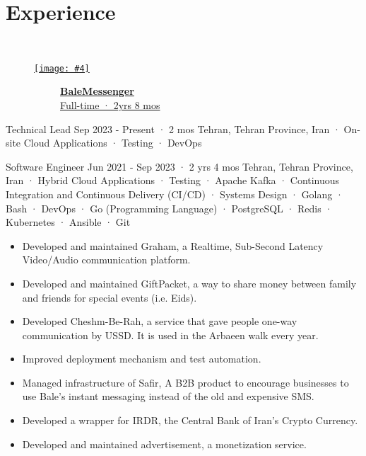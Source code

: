 \documentclass[a4paper,20pt]{article}
\newcommand{\companyHeadingWithImage}[4]{
    \vspace{-24pt}
    \begin{figure}[H]
        \href{#2}{\texttt{[image: \#4]}}
        \vspace{-37.5pt}
    \end{figure}
    ~~~~~~~~~~~\textbf{\href{#2}{#1}} \\
    ~~~~~~~~~~~\href{#2}{#3}
    \vspace{6pt}
}
\newcounter{mylist} %
\newenvironment{myitemize}{%
  \stepcounter{mylist}%
  \begin{itemize}
}{\end{itemize}%
  }
\begin{document}
\section{Experience}\
    \companyHeadingWithImage{BaleMessenger}{https://www.linkedin.com/company/balemessenger}{Full-time · 2yrs 8 mos}{bale}
    \begin{myitemize}
        \begin{newexperience}                
            {Technical Lead}
            {Sep 2023 - Present · 2 mos}
            {Tehran, Tehran Province, Iran · On-site}
            {Cloud Applications · Testing · DevOps}
        \end{newexperience}

        \begin{newexperiencewithdesc}
            {Software Engineer}
            {Jun 2021 - Sep 2023 · 2 yrs 4 mos}
            {Tehran, Tehran Province, Iran · Hybrid}
            {Cloud Applications · Testing · Apache Kafka · Continuous Integration and Continuous Delivery (CI/CD) · Systems Design · Golang · Bash · DevOps · Go (Programming Language) · PostgreSQL · Redis · Kubernetes · Ansible · Git}
            {
                \begin{itemize}
                    \item Developed and maintained Graham, a Realtime, Sub-Second Latency Video/Audio communication platform.
                    \item Developed and maintained GiftPacket, a way to share money between family and friends for special events (i.e. Eids).
                    \item Developed Cheshm-Be-Rah, a service that gave people one-way communication by USSD. It is used in the Arbaeen walk every year.
                    \item Improved deployment mechanism and test automation.
                    \item Managed infrastructure of Safir, A B2B product to encourage 
                    businesses to use Bale's instant messaging instead of the old and 
                    expensive SMS.
                    \item Developed a wrapper for IRDR, the Central Bank of Iran's Crypto Currency.
                    \item Developed and maintained advertisement, a monetization service.
                \end{itemize}
            }
        \end{newexperiencewithdesc}


\end{myitemize}
\end{document}
